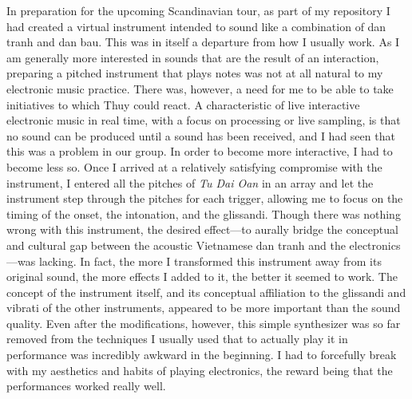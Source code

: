 \documentclass[a4paper]{article}
\begin{document}
In preparation for the upcoming Scandinavian tour, as part of my repository I had created a virtual instrument intended to sound like a combination of dan tranh and dan bau. This was in itself a departure from how I usually work. As I am generally more interested in sounds that are the result of an interaction, preparing a pitched instrument that plays notes was not at all natural to my electronic music practice. There was, however, a need for me to be able to take initiatives to which Thuy could react. A characteristic of live interactive electronic music in real time, with a focus on processing or live sampling, is that no sound can be produced until a sound has been received, and I had seen that this was a problem in our group. In order to become more interactive, I had to become less so. Once I arrived at a relatively satisfying compromise with the instrument, I entered all the pitches of \emph{Tu Dai Oan} in an array and let the instrument step through the pitches for each trigger, allowing me to focus on the timing of the onset, the intonation, and the glissandi. Though there was nothing wrong with this instrument, the desired effect—to aurally bridge the conceptual and cultural gap between the acoustic Vietnamese dan tranh and the electronics—was lacking. In fact, the more I transformed this instrument away from its original sound, the more effects I added to it, the better it seemed to work. The concept of the instrument itself, and its conceptual affiliation to the glissandi and vibrati of the other instruments, appeared to be more important than the sound quality. Even after the modifications, however, this simple synthesizer was so far removed from the techniques I usually used that to actually play it in performance was incredibly awkward in the beginning. I had to forcefully break with my aesthetics and habits of playing electronics, the reward being that the performances worked really well.
\end{document}
